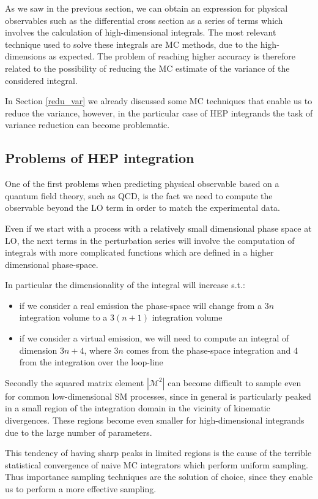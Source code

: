 \documentclass[../main/main.tex]{subfiles}
\begin{document}
As we saw in the previous section, we can obtain an expression for physical observables such as the differential cross section as a series of terms which involves the calculation of high-dimensional integrals. The most relevant technique used to solve these integrals are MC methods, due to the high-dimensions as expected. The problem of reaching higher accuracy is therefore related 
to the possibility of reducing the MC estimate of the variance of the considered integral.

In Section \ref{redu_var} we already discussed some MC techniques that enable us to reduce the variance, however, in the particular case of HEP integrands the task of variance reduction can become problematic.

\subsection{Problems of HEP integration}
One of the first problems when predicting physical observable based on a quantum field theory, such as QCD, is the fact we need to compute the observable beyond the LO term in order to match the experimental data. 

Even if we start with a process with a relatively small dimensional phase space  at LO, the next terms in the perturbation series will involve the computation of integrals with more complicated functions which are defined in a higher dimensional phase-space.

In particular the dimensionality of the integral will increase s.t.:
\begin{itemize}
	\item if we consider a real emission  the phase-space will change from a $3 n$ integration volume to a $3(n+1)$ integration volume
	\item if we consider a virtual emission, we will need to compute an integral of dimension $3n +4$, where $3n$ comes from the phase-space integration and $4$ from the integration over the loop-line
\end{itemize}

Secondly the squared matrix element $|\mathcal{M}^2|$ can become difficult to sample even for common low-dimensional SM processes, since 
in general is particularly peaked in a small region of the integration domain in the vicinity of kinematic divergences. These regions become even smaller for high-dimensional integrands due to the large number of parameters.

This tendency of having sharp peaks in limited regions is the cause of the terrible statistical convergence of naive MC integrators which 
perform uniform sampling. Thus importance sampling techniques are the solution of choice, since they enable us to perform a more effective 
sampling.
\end{document}

